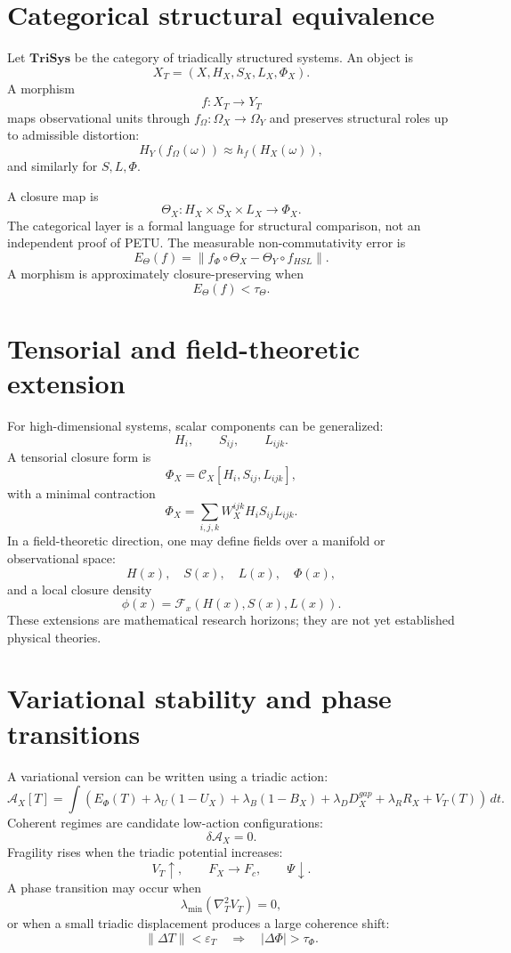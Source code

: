 \documentclass[11pt,a4paper]{article}
\newcommand{\Tri}{\mathbf{TriSys}}
\begin{document}
\section{Categorical structural equivalence}

Let $\Tri$ be the category of triadically structured systems.
An object is
\[
X_T=(X,H_X,S_X,L_X,\Phi_X).
\]
A morphism
\[
f:X_T\rightarrow Y_T
\]
maps observational units through $f_\Omega:\Omega_X\rightarrow\Omega_Y$ and preserves structural roles up to admissible distortion:
\[
H_Y(f_\Omega(\omega))\approx h_f(H_X(\omega)),
\]
and similarly for $S,L,\Phi$.

A closure map is
\[
\Theta_X:H_X\times S_X\times L_X\rightarrow \Phi_X.
\]
The categorical layer is a formal language for structural comparison, not an independent proof of PETU.
The measurable non-commutativity error is
\[
E_\Theta(f)=
\left\|
f_\Phi\circ\Theta_X-\Theta_Y\circ f_{HSL}
\right\|.
\]
A morphism is approximately closure-preserving when
\[
E_\Theta(f)<\tau_\Theta.
\]

\section{Tensorial and field-theoretic extension}

For high-dimensional systems, scalar components can be generalized:
\[
H_i,\qquad S_{ij},\qquad L_{ijk}.
\]
A tensorial closure form is
\[
\Phi_X=\mathcal{C}_X[H_i,S_{ij},L_{ijk}],
\]
with a minimal contraction
\[
\Phi_X=
\sum_{i,j,k}W^{ijk}_XH_iS_{ij}L_{ijk}.
\]
In a field-theoretic direction, one may define fields over a manifold or observational space:
\[
H(x),\quad S(x),\quad L(x),\quad \Phi(x),
\]
and a local closure density
\[
\phi(x)=\mathcal{F}_x(H(x),S(x),L(x)).
\]
These extensions are mathematical research horizons; they are not yet established physical theories.

\section{Variational stability and phase transitions}

A variational version can be written using a triadic action:
\[
\mathcal{A}_X[T]=
\int
\left(
E_\Phi(T)
+\lambda_U(1-U_X)
+\lambda_B(1-B_X)
+\lambda_DD_X^{gap}
+\lambda_RR_X
+V_T(T)
\right)\,dt.
\]
Coherent regimes are candidate low-action configurations:
\[
\delta\mathcal{A}_X=0.
\]
Fragility rises when the triadic potential increases:
\[
V_T\uparrow,\qquad F_X\rightarrow F_c,\qquad \Psi\downarrow.
\]
A phase transition may occur when
\[
\lambda_{\min}\left(\nabla_T^2V_T\right)=0,
\]
or when a small triadic displacement produces a large coherence shift:
\[
\|\Delta T\|<\varepsilon_T
\quad\Rightarrow\quad
|\Delta\Phi|>\tau_\Phi.
\]
\end{document}
